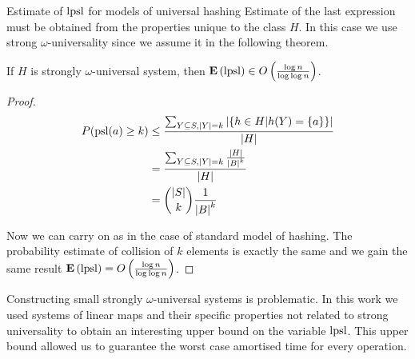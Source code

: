\begin{section}{Estimate of $\mathrm{lpsl}$ for models of universal hashing}
Estimate of the last expression must be obtained from the properties unique to the class $H$. In this case we use strong $\omega$-universality since we assume it in the following theorem.

\begin{theorem}
If $H$ is strongly $\omega$-universal system, then $\mathbf{E}\left(\mathrm{lpsl}\right) \in O\left(\frac{\log n}{\log \log n}\right)$.
\end{theorem}
\begin{proof}
\begin{displaymath}
\begin{split}
P(\mathrm{psl}(a) \geq k) 
	& \leq \frac{\sum\displaylimits_{Y \subseteq S, |Y| = k} | \{ h \in H | h(Y) = \{a\} \}|}{|H|} \\
	& = \frac{\sum\displaylimits_{Y \subseteq S, |Y| = k} \frac{|H|}{{|B|}^{k}}}{|H|} \\
	& = \dbinom{|S|}{k}\frac{1}{{|B|}^k}
\end{split}
\end{displaymath}

Now we can carry on as in the case of standard model of hashing. The probability estimate of collision of $k$ elements is exactly the same and we gain the same result $\mathbf{E}\left(\mathrm{lpsl}\right) = O\left(\frac{\log n}{\log \log n}\right)$.
\end{proof}

Constructing small strongly $\omega$-universal systems is problematic. In this work we used systems of linear maps and their specific properties not related to strong universality to obtain an interesting upper bound on the variable $\mathrm{lpsl}$. This upper bound allowed us to guarantee the worst case amortised time for every operation.
\end{section}
